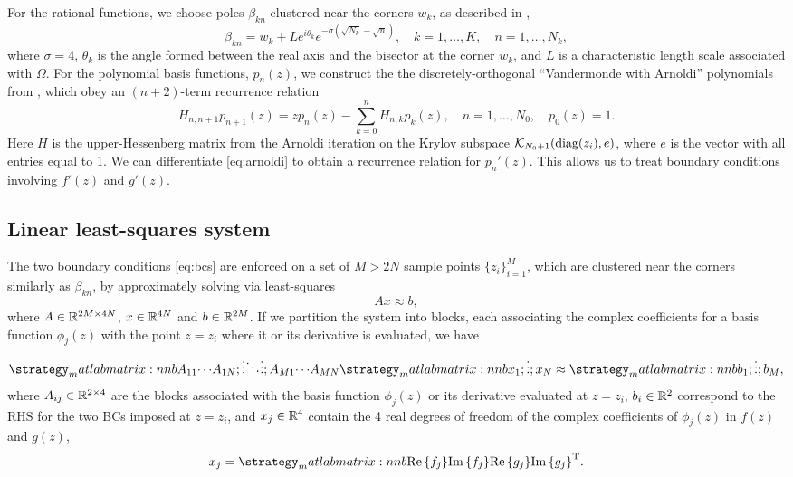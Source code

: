 For the rational functions, we choose poles $\beta_{kn}$ clustered near the corners $w_k$, as described in \cite{gopal19},
\begin{equation}
\beta_{kn} = w_k + Le^{i\theta_k} e^{-\sigma (\sqrt{N_k}-\sqrt{n})}, \quad k=1,\ldots,K,\quad n=1,\ldots,N_k,
\end{equation}
where $\sigma=4$, $\theta_k$ is the angle formed between the real axis and the bisector at the corner $w_k$, and $L$ is a characteristic length scale associated with $\Omega$. For the polynomial basis functions, $p_n(z)$, we construct the  the discretely-orthogonal ``Vandermonde with Arnoldi'' polynomials from \cite{brubeck19}, which obey an $(n+2)$-term recurrence relation
\begin{equation} \label{eq:arnoldi}
H_{n,n+1} p_{n+1}(z) = z p_n(z) - \sum_{k=0}^n H_{n,k} p_k(z),\quad n=1,\ldots,N_0, \quad p_0(z)=1.
\end{equation}
Here $H$ is the upper-Hessenberg matrix from the Arnoldi iteration on the Krylov subspace $\mathcal{K}_{N_0+1}(\operatorname{diag}(z_i), e)$, where $e$ is the vector with all entries equal to 1. We can differentiate \eqref{eq:arnoldi} to obtain a recurrence relation for $p_n'(z)$. This allows us to treat boundary conditions involving $f'(z)$ and $g'(z)$.



\subsection{Linear least-squares system}
The two boundary conditions \eqref{eq:bcs} are enforced on a set of $M > 2N$ sample points $\{z_i \}_{i=1}^M$, which
are clustered near the corners similarly as $\beta_{kn}$, by approximately solving via least-squares
\begin{equation} \label{eq:LS}
A x\approx b,
\end{equation}
where $A\in\mathbb{R}^{2M\times 4N}$, $x\in\mathbb{R}^{4N}$ and $b\in\mathbb{R}^{2M}$. If we partition the system into blocks, each associating the complex coefficients for a basis function $\phi_j(z)$ with the point $z=z_i$ where it or its derivative is evaluated, we have
\begin{equation}
\matlabmatrix{A_{11} {\cdots} A_{1N}; {\vdots} {\ddots} {\vdots}; A_{M1} {\cdots} A_{MN}}
\matlabmatrix{x_{1}; {\vdots}; x_{N}} \approx \matlabmatrix{b_{1}; {\vdots}; b_{M}},
\end{equation}
where $A_{ij}\in\mathbb{R}^{2\times 4}$ are the blocks associated with the basis function $\phi_{j}(z)$ or its derivative evaluated at $z=z_i$, $b_i\in\mathbb{R}^2$ correspond to the RHS for the two BCs imposed at $z=z_i$, and $x_j\in\mathbb{R}^4$ contain the 4 real degrees of freedom of the complex coefficients of $\phi_j(z)$ in $f(z)$ and $g(z)$,
\begin{equation}
x_ j = \matlabmatrix{\real{f_j} \imag{f_j} \real{g_j} \imag{g_j}}^\transp.
\end{equation}


